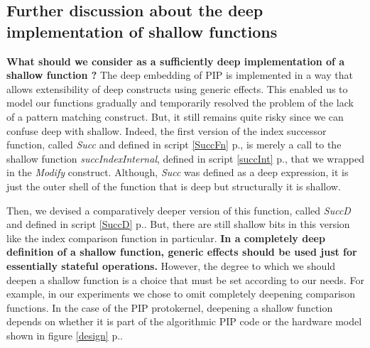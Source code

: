 \subsection{Further discussion about the deep implementation of shallow functions}
\textbf{What should we consider as a sufficiently deep implementation of a shallow function ?} The deep embedding of PIP is implemented in a way that allows extensibility of deep constructs using generic effects. This enabled us to model our functions gradually and temporarily resolved the problem of the lack of a pattern matching construct. But, it still remains quite risky since we can confuse deep with shallow. Indeed, the first version of the index successor function, called \textit{Succ} and defined in script \ref{SuccFn} p.\pageref{SuccFn}, is merely a call to the shallow function \textit{succIndexInternal}, defined in script \ref{succInt} p.\pageref{succInt}, that we wrapped in the \textit{Modify} construct. Although, \textit{Succ} was  defined as a deep expression, it is just the outer shell of the function that is deep but structurally it is shallow. \pagebreak

Then, we devised a comparatively deeper version of this function, called \textit{SuccD} and defined in script \ref{SuccD} p.\pageref{SuccD}. But, there are still shallow bits in this version like the index comparison function in particular. \textbf{In a completely deep definition of a shallow function, generic effects should be used just for essentially stateful operations.} However, the degree  to which we should deepen a shallow function is a choice that must be set according to our needs. For example, in our experiments we chose to omit completely deepening comparison functions. In the case of the PIP protokernel, deepening a shallow function depends on whether it is part of the algorithmic PIP code or the hardware model shown in figure \ref{design} p.\pageref{design}. 